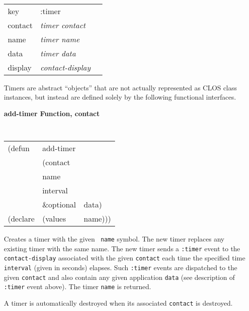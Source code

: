 \begin{center} 
\tt
\begin{tabular}{lll}
key       & :timer\\
contact   & {\em timer contact}\\
name      & {\em timer name}\\
data      & {\em timer data}\\
display      & {\em contact-display}
\end{tabular}
\rm
\end{center}

Timers are abstract ``objects'' that are not actually represented as CLOS class
instances, but instead are defined solely by the following functional
interfaces.

{\samepage
{\large {\bf add-timer \hfill Function, contact}} 
\begin{flushright} \parbox[t]{6.125in}{
\tt
\begin{tabular}{lll}
\raggedright
(defun & add-timer & \\ 
& (contact\\ 
& name\\
& interval\\
& \&optional & data)\\
(declare & (values  & name)))
\end{tabular}
\rm

}\end{flushright}
}

\begin{flushright} \parbox[t]{6.125in}{ Creates a timer with the given {\tt
name} symbol.  The new timer replaces any existing timer with the same name. The
new timer sends a {\tt :timer} event to the {\tt contact-display}
associated with the given {\tt contact} each time the specified time {\tt
interval} (given in seconds) elapses\footnotemark.  Such {\tt :timer} events 
are dispatched to the given {\tt contact} and also contain any given application
{\tt data} (see description of {\tt :timer} event above). The timer {\tt name} is
returned.

A timer is automatically destroyed when its associated {\tt contact} is
destroyed.

}\end{flushright}

